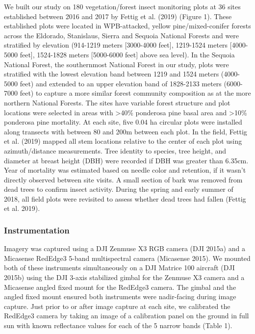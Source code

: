 \documentclass[]{article}
\begin{document}
We built our study on 180 vegetation/forest insect monitoring plots at
36 sites established between 2016 and 2017 by Fettig et al. (2019)
(Figure 1). These established plots were located in WPB-attacked, yellow
pine/mixed-conifer forests across the Eldorado, Stanislaus, Sierra and
Sequoia National Forests and were stratified by elevation (914-1219
meters {[}3000-4000 feet{]}, 1219-1524 meters {[}4000-5000 feet{]},
1524-1828 meters {[}5000-6000 feet{]} above sea level). In the Sequoia
National Forest, the southernmost National Forest in our study, plots
were stratified with the lowest elevation band between 1219 and 1524
meters (4000-5000 feet) and extended to an upper elevation band of
1828-2133 meters (6000-7000 feet) to capture a more similar forest
community composition as at the more northern National Forests. The
sites have variable forest structure and plot locations were selected in
areas with \textgreater{}40\% ponderosa pine basal area and
\textgreater{}10\% ponderosa pine mortality. At each site, five 0.04 ha
circular plots were installed along transects with between 80 and 200m
between each plot. In the field, Fettig et al. (2019) mapped all stem
locations relative to the center of each plot using azimuth/distance
measurements. Tree identity to species, tree height, and diameter at
breast height (DBH) were recorded if DBH was greater than 6.35cm. Year
of mortality was estimated based on needle color and retention, if it
wasn't directly observed between site visits. A small section of bark
was removed from dead trees to confirm insect activity. During the
spring and early summer of 2018, all field plots were revisited to
assess whether dead trees had fallen (Fettig et al. 2019).

\subsubsection{Instrumentation}\label{instrumentation}

Imagery was captured using a DJI Zenmuse X3 RGB camera (DJI 2015a) and a
Micasense RedEdge3 5-band multispectral camera (Micasense 2015). We
mounted both of these instruments simultaneously on a DJI Matrice 100
aircraft (DJI 2015b) using the DJI 3-axis stabilized gimbal for the
Zenmuse X3 camera and a Micasense angled fixed mount for the RedEdge3
camera. The gimbal and the angled fixed mount ensured both instruments
were nadir-facing during image capture. Just prior to or after image
capture at each site, we calibrated the RedEdge3 camera by taking an
image of a calibration panel on the ground in full sun with known
reflectance values for each of the 5 narrow bands (Table 1).
\end{document}
